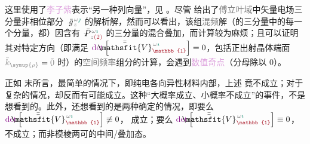 这里使用了\textcolor{Plum}{李子紫}表示“另一种列向量”，见 。尽管  给出了\textcolor{gray}{傅立叶域}中矢量电场三分量\textcolor{NavyBlue}{非相位部分} $\xint{{}^{}_{\mathcolor{gray}{-}}}{10}{\bar{g}}^{\;\!\mathcolor{gray}{\omega} \textcolor{PineGreen}{\jmath}}_{\;\! \mathcolor{gray}{z}}$ 的解析解，然而可以看出，该组\textcolor{gray}{混频}解（的三分量中的每一个分量，都）因含有 $\xint{\mathcolor{gray}{-}}{24}{\bar{P}}^{\;\! \mathcolor{gray}{\omega} \textcolor{PineGreen}{\imath}}_{\;\! \mathcolor{gray}{z} \textcolor{Maroon}{(2)}}$ 的三分量的混合叠加，而计算较为麻烦；且可以证明其对特定方向（即满足 $\textcolor{Plum}{\det} \left[ \xint{\mathcolor{gray}{-}}{25}{\bar{\bar{\mathsfit{V}}}}^{\;\! \mathcolor{gray}{\omega} \textcolor{PineGreen}{\imath}}_{\textcolor{Maroon}{\mathbb{1}}} \right] = 0$，包括正出射晶体端面 $\mathcolor{gray}{\bar{k}_{\symup{\rho}}} = \mathcolor{gray}{\bar{0}}$ 时）的\textcolor{gray}{空间频率}组分的计算，会遇到\textcolor{Plum}{数值奇点}（分母除以 $0$）。

正如  末所言，最简单的情况下，即\textcolor{PineGreen}{纯电各向异性}材料内部，上述  竟不成立；对于复杂的情况，却反而有可能成立。这种“大概率成立、小概率不成立”的事件，不是想看到的。此外，还想看到的是两种确定的情况，即要么 $\textcolor{Plum}{\det} \left[ \xint{\mathcolor{gray}{-}}{25}{\bar{\bar{\mathsfit{V}}}}^{\;\! \mathcolor{gray}{\omega} \textcolor{PineGreen}{\imath}}_{\textcolor{Maroon}{\mathbb{1}}} \right] \not\equiv 0$， 成立；要么 $\textcolor{Plum}{\det} \left[ \xint{\mathcolor{gray}{-}}{25}{\bar{\bar{\mathsfit{V}}}}^{\;\! \mathcolor{gray}{\omega} \textcolor{PineGreen}{\imath}}_{\textcolor{Maroon}{\mathbb{1}}} \right] \equiv 0$， 不成立；而非模棱两可的中间/叠加态。

